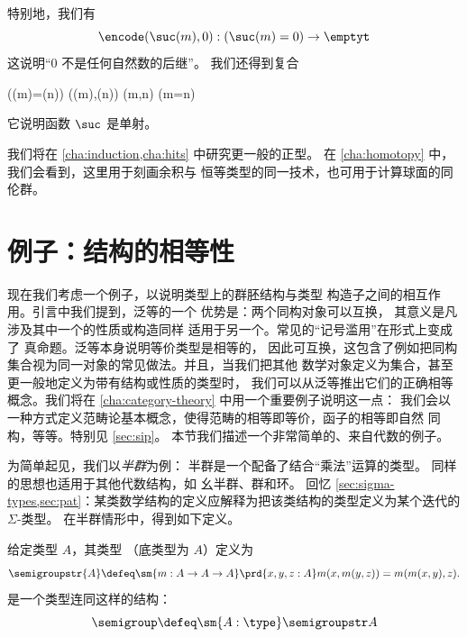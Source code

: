 特别地，我们有
\begin{equation}\label{eq:zero-not-succ}
  \encode(\suc(m),0) : (\suc(m)=0) \to \emptyt
\end{equation}
这说明“$0$ 不是任何自然数的后继”。
我们还得到复合
\begin{narrowmultline}\label{eq:suc-injective}
  (\suc(m)=\suc(n))
  \xrightarrow{\encode} \narrowbreak
  \code(\suc(m),\suc(n))
  \jdeq \code(m,n) \xrightarrow{\decode} (m=n)
\end{narrowmultline}
它说明函数 $\suc$ 是单射。
%

我们将在 \cref{cha:induction,cha:hits} 中研究更一般的正型。
在 \cref{cha:homotopy} 中，我们会看到，这里用于刻画余积与 \nat 恒等类型的同一技术，也可用于计算球面的同伦群。

%
%
\section{例子：结构的相等性}
\label{sec:equality-of-structures}

现在我们考虑一个例子，以说明类型上的群胚结构与类型
构造子之间的相互作用。引言中我们提到，泛等的一个
优势是：两个同构对象可以互换，
其意义是凡涉及其中一个的性质或构造同样
适用于另一个。常见的“记号滥用”在形式上变成了
真命题。泛等本身说明等价类型是相等的，
因此可互换，这包含了例如把同构集合视为同一对象的常见做法。并且，当我们把其他
数学对象定义为集合，甚至更一般地定义为带有结构或性质的类型时，
我们可以从泛等推出它们的正确相等概念。我们将在 \cref{cha:category-theory} 中用一个重要例子说明这一点：
我们会以一种方式定义范畴论基本概念，使得范畴的相等即等价，函子的相等即自然
同构，等等。特别见 \cref{sec:sip}。
本节我们描述一个非常简单的、来自代数的例子。

为简单起见，我们以\emph{半群}为例：
半群是一个配备了结合“乘法”运算的类型。
同样的思想也适用于其他代数结构，如
幺半群、群和环。
回忆 \cref{sec:sigma-types,sec:pat}：某类数学结构的定义应解释为把该类结构的类型定义为某个迭代的 $\Sigma$-类型。
在半群情形中，得到如下定义。

\begin{defn}
给定类型 $A$，其类型 
%
%
%
（底类型为 $A$）定义为
\[
\semigroupstr{A} \defeq \sm{m:A \to A \to A} \prd{x,y,z:A} m(x,m(y,z)) = m(m(x,y),z).
\]
%
%
是一个类型连同这样的结构：
%
\[
\semigroup \defeq \sm{A:\type} \semigroupstr A
\]
\end{defn}

